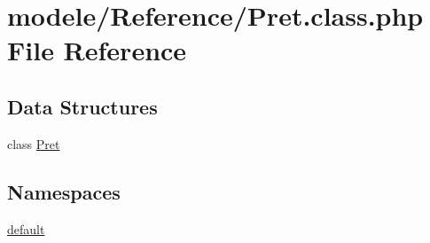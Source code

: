 \hypertarget{_pret_8class_8php}{}\section{modele/\+Reference/\+Pret.class.\+php File Reference}
\label{_pret_8class_8php}
\subsection*{Data Structures}
\begin{DoxyCompactItemize}
\item 
class \hyperlink{class_pret}{Pret}
\end{DoxyCompactItemize}
\subsection*{Namespaces}
\begin{DoxyCompactItemize}
\item 
 \hyperlink{namespacedefault}{default}
\end{DoxyCompactItemize}

